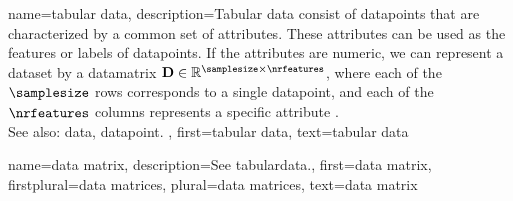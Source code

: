 {name={tabular data},
	description={Tabular \gls{data} consist of \glspl{datapoint} 
		that are characterized by a common set of attributes. These attributes 
		can be used as the \glspl{feature} or \glspl{label} of \glspl{datapoint}. 
		If the attributes are numeric, we can represent a \gls{dataset} by 
		a \gls{datamatrix} $\mathbf{D} \in \mathbb{R}^{\samplesize \times \nrfeatures}$, 
		where each of the $\samplesize$ rows corresponds to a single \gls{datapoint},
		and each of the $\nrfeatures$ columns represents a specific attribute \cite{Everitt2022}.
		\\
		See also: \gls{data}, \gls{datapoint}. }, 
	first={tabular data},
	text={tabular data}
}

{name={data matrix},
	description={See \gls{tabulardata}.}, 
	first={data matrix},
	firstplural={data matrices},
	plural={data matrices},
	text={data matrix}
}
		
